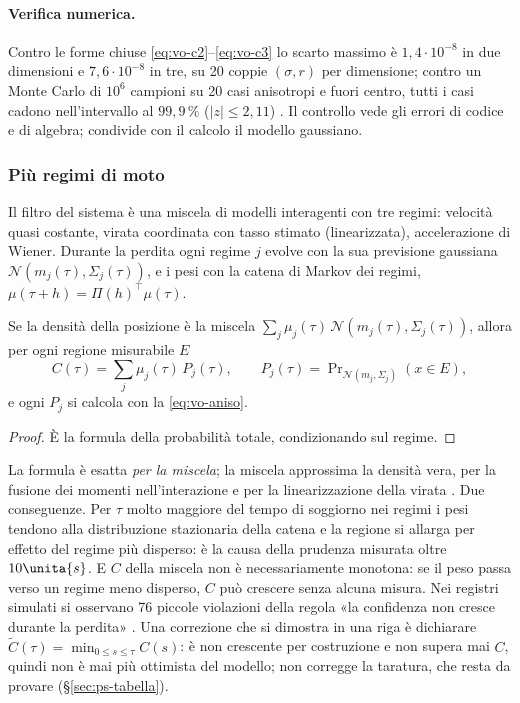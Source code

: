 \paragraph{Verifica numerica.} Contro le forme chiuse \eqref{eq:vo-c2}--\eqref{eq:vo-c3} lo scarto massimo è $1{,}4\cdot10^{-8}$ in due dimensioni e $7{,}6\cdot10^{-8}$ in tre, su 20 coppie $(\sigma,r)$ per dimensione; contro un Monte Carlo di $10^6$ campioni su 20 casi anisotropi e fuori centro, tutti i casi cadono nell'intervallo al $99{,}9\,\%$ ($|z|\le2{,}11$) . Il controllo vede gli errori di codice e di algebra; condivide con il calcolo il modello gaussiano.

\subsubsection{Più regimi di moto}\label{sec:vo-c-imm}

Il filtro del sistema è una miscela di modelli interagenti \cite{barshalom2001} con tre regimi: velocità quasi costante, virata coordinata con tasso stimato (linearizzata), accelerazione di Wiener. Durante la perdita ogni regime $j$ evolve con la sua previsione gaussiana $\mathcal N(m_j(\tau),\Sigma_j(\tau))$, e i pesi con la catena di Markov dei regimi, $\mu(\tau+h)=\Pi(h)^\top\mu(\tau)$.

\begin{proposizione}\label{prop:vo-imm}
Se la densità della posizione è la miscela $\sum_j\mu_j(\tau)\,\mathcal N(m_j(\tau),\Sigma_j(\tau))$, allora per ogni regione misurabile $E$
\[C(\tau)=\sum_j\mu_j(\tau)\,P_j(\tau),\qquad P_j(\tau)=\Pr\nolimits_{\mathcal N(m_j,\Sigma_j)}(x\in E),\]
e ogni $P_j$ si calcola con la \eqref{eq:vo-aniso}.
\end{proposizione}
\begin{proof}
È la formula della probabilità totale, condizionando sul regime.
\end{proof}
La formula è esatta \emph{per la miscela}; la miscela approssima la densità vera, per la fusione dei momenti nell'interazione e per la linearizzazione della virata . Due conseguenze. Per $\tau$ molto maggiore del tempo di soggiorno nei regimi i pesi tendono alla distribuzione stazionaria della catena e la regione si allarga per effetto del regime più disperso: è la causa della prudenza misurata oltre $10\unita{s}$. E $C$ della miscela non è necessariamente monotona: se il peso passa verso un regime meno disperso, $C$ può crescere senza alcuna misura. Nei registri simulati si osservano 76 piccole violazioni della regola «la confidenza non cresce durante la perdita» . Una correzione che si dimostra in una riga è dichiarare $\tilde C(\tau)=\min_{0\le s\le\tau}C(s)$: è non crescente per costruzione e non supera mai $C$, quindi non è mai più ottimista del modello; non corregge la taratura, che resta da provare (\S\ref{sec:ps-tabella}).


